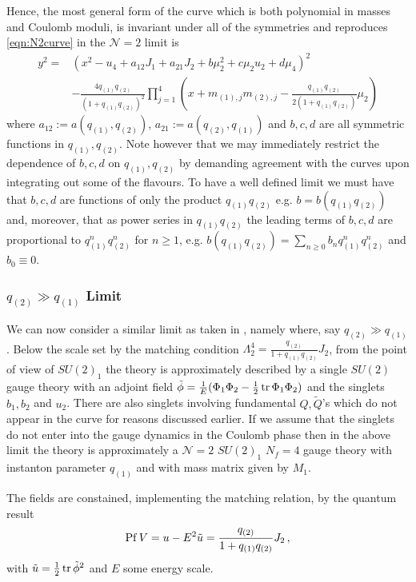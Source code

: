 \documentclass[main.tex]{subfiles}
\begin{document}
Hence, the most general form of the curve which is both polynomial in masses and Coulomb moduli, is invariant under all of the symmetries and reproduces \eqref{eqn:N2curve} in the $\mathcal{N}=2$ limit is
\begin{equation}\label{eqn:gencurve}
\begin{aligned}
y^2=&\left(x^2-u_4+a_{12}J_1+a_{21}J_2+b\mu_2^2+c\mu_2 u_2+d\mu_4\right)^2\\
&-\frac{4q_{(1)}q_{(2)}}{(1+q_{(1)}q_{(2)})^2}\prod_{j=1}^4\left(x+m_{(1),j}m_{(2),j}-\frac{q_{(1)}q_{(2)}}{2(1+q_{(1)}q_{(2)})}\mu_2\right)
\end{aligned}
\end{equation}
where $a_{12}:=a(q_{(1)},q_{(2)})$, $a_{21}:=a(q_{(2)},q_{(1)})$ and $b,c,d$ are all symmetric functions in $q_{(1)},q_{(2)}$. Note however that we may immediately restrict the dependence of $b,c,d$ on $q_{(1)},q_{(2)}$ by demanding agreement with the curves \cite{Gremm:1997sz,Intriligator:1994sm} upon integrating out some of the flavours. To have a well defined limit we must have that $b,c,d$ are functions of only the product $q_{(1)}q_{(2)}$ e.g. $b=b(q_{(1)}q_{(2)})$ and, moreover, that as power series in $q_{(1)}q_{(2)}$ the leading terms of $b,c,d$ are proportional to $q_{(1)}^nq_{(2)}^{n}$ for $n\geq 1$, e.g. $b(q_{(1)}q_{(2)})=\sum_{n\geq0}b_nq_{(1)}^nq_{(2)}^n$ and $b_0\equiv0$.

\subsubsection{$q_{(2)}\gg q_{(1)}$ Limit}
We can now consider a similar limit as taken in \cite{Intriligator:1994sm}, namely where, say $q_{(2)}\gg q_{(1)}$. Below the scale set by the matching condition $\Lambda_2^4=\frac{q_{(2)}}{1+q_{(1)}q_{(2)}}J_2$, from the point of view of $SU(2)_1$ the theory is approximately described by a single $SU(2)$ gauge theory with an adjoint field $\tilde{\phi}=\frac{1}{E}(\Phi_1\Phi_2-\frac{1}{2}\operatorname{tr}\Phi_1\Phi_2)$ and the singlets $b_1,b_2$ and $u_2$. There are also singlets involving fundamental $Q,\widetilde{Q}$'s which do not appear in the curve for reasons discussed earlier. If we assume that the singlets do not enter into the gauge dynamics in the Coulomb phase then in the above limit the theory is approximately a $\mathcal{N}=2$ $SU(2)_1$ $N_f=4$  gauge theory with instanton parameter $q_{(1)}$ and with mass matrix given by $M_1$.

The fields are constained, implementing the matching relation, by the quantum result \cite{Seiberg:1994bz}
\begin{equation}\label{eqn:Pfaffian}
\operatorname{Pf} V=u-E^2\tilde{u}=\frac{q_{(2)}}{1+q_{(1)}q_{(2)}}J_2\,,
\end{equation}
with $\tilde{u}=\frac{1}{2}\operatorname{tr}\tilde{\phi}^2$ and $E$ some energy scale.
\end{document}
